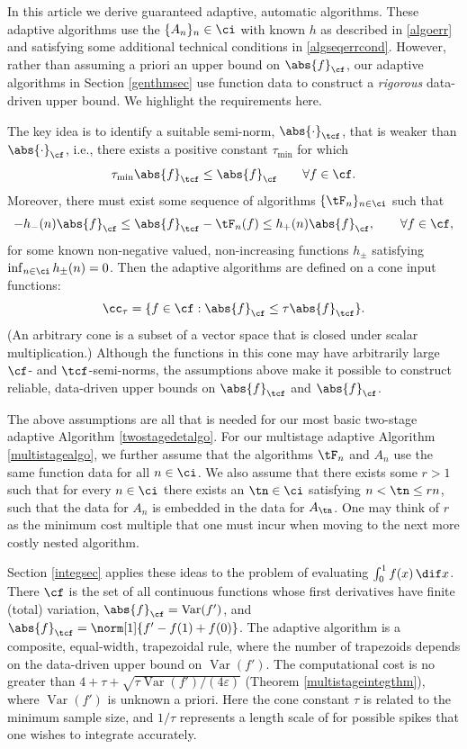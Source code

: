\documentclass[]{elsarticle}
\DeclareMathOperator{\Var}{Var}
\theoremstyle{definition}
\theoremstyle{remark}
\newcommand{\Fnorm}[1]{\abs{#1}_{\cf}}
\newcommand{\Ftnorm}[1]{\abs{#1}_{\tcf}}
\begin{document}
In this article we derive guaranteed adaptive, automatic algorithms.  These adaptive algorithms use the $\{A_n\}_n \in \ci$ with known $h$ as described in \eqref{algoerr} and satisfying some additional technical conditions in \eqref{algseqerrcond}.  However, rather than assuming a priori an upper bound on $\Fnorm{f}$, our adaptive algorithms in Section \ref{genthmsec} use function data to construct a \emph{rigorous} data-driven upper bound.  We highlight the requirements here.

The key idea is to identify a suitable semi-norm, $\Ftnorm{\cdot}$, that is weaker than $\Fnorm{\cdot}$, i.e., there exists a positive constant $\tau_{\min}$ for which 
\begin{equation} \label{Fspacecondstrong}
\tau_{\min} \Ftnorm{f} \le \Fnorm{f} \qquad \forall f \in \cf.
\end{equation}
Moreover, there must exist some sequence of algorithms $\{\tF_n\}_{n\in \ci}$ such that 
\begin{equation} \label{Gerrbds}
-h_{-}(n)\Fnorm{f} \le \Ftnorm{f}- \tF_n(f) \le h_{+}(n) \Fnorm{f}, \qquad \forall f \in \cf,
\end{equation}
for some known non-negative valued, non-increasing functions $h_{\pm}$ satisfying $\inf_{n \in \ci} h_{\pm}(n) = 0$.  Then the adaptive algorithms are defined on a cone input functions:
\begin{equation} \label{conedef}
\cc_{\tau}=\{f \in \cf : \Fnorm{f} \le \tau \Ftnorm{f} \}.
\end{equation}
(An arbitrary cone is a subset of a vector space that is closed under scalar multiplication.) Although the functions in this cone may have arbitrarily large $\cf$- and $\tcf$-semi-norms, the assumptions above make it
possible to construct reliable, data-driven upper bounds on $\Ftnorm{f}$ and $\Fnorm{f}$. 

The above assumptions are all that is needed for our most basic two-stage adaptive Algorithm \ref{twostagedetalgo}.  For our multistage adaptive Algorithm \ref{multistagealgo}, we further assume that the algorithms $\tF_n$ and $A_n$ use the same function data for all $n \in \ci$.  We also assume that there exists some $r>1$ such that for every $n \in \ci$ there exists an $\tn \in \ci$ satisfying $n < \tn \le rn$, such that the data for $A_n$ is embedded in the data for $A_{\tn}$. One may think of $r$ as the minimum cost multiple that one must incur when moving to the next more costly nested algorithm.

Section \ref{integsec} applies these ideas to the problem of evaluating $\int_0^1 f(x) \, \dif x$.  There $\cf$ is the set of all continuous functions whose first derivatives have finite (total) variation, $\Fnorm{f}=\Var(f')$, and $\Ftnorm{f}=\norm[1]{f'-f(1)+f(0)}$.  The adaptive algorithm is a composite, equal-width, trapezoidal rule, where the number of trapezoids depends on the data-driven upper bound on $\Var(f')$.  The computational cost is no greater than $4+ \tau + \sqrt{\tau \Var(f')/(4\varepsilon)}$ (Theorem \ref{multistageintegthm}), where $\Var(f')$ is unknown a priori. Here the cone constant $\tau$ is related to the minimum sample size, and $1/\tau$ represents a length scale of for possible spikes that one wishes to integrate accurately.
\end{document}
